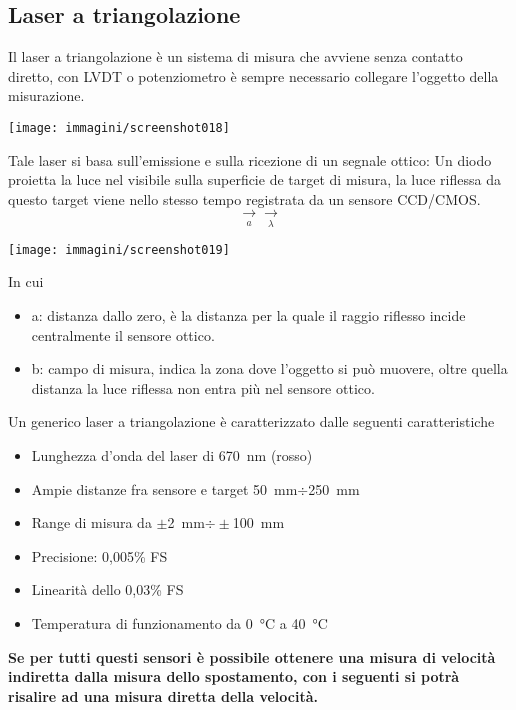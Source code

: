 \documentclass[a4paper, 15pt]{article}
\begin{document}
\subsection{Laser a triangolazione}
\begin{adjustwidth}{2in}{}	 
	Il laser a triangolazione è un sistema di misura che avviene senza contatto diretto, con LVDT o potenziometro è sempre necessario collegare l'oggetto della misurazione. 
	\begin{center}
		\texttt{[image: immagini/screenshot018]}
	\end{center}
	Tale laser si basa sull'emissione e sulla ricezione di un segnale ottico: Un diodo proietta la luce nel visibile sulla superficie de target di misura, la luce riflessa da questo target viene nello stesso tempo registrata da un sensore CCD/CMOS. 
	\[\underset{a}{\rightarrow} \boxed{} \underset{\lambda}{\rightarrow}\] 
	\begin{center}
		\texttt{[image: immagini/screenshot019]}
	\end{center}
	In cui 
	\begin{itemize}
		\item a: distanza dallo zero, è la distanza per la quale il raggio riflesso incide centralmente il sensore ottico.
		\item b: campo di misura, indica la zona dove l'oggetto si può muovere, oltre quella distanza la luce riflessa non entra più nel sensore ottico. 
	\end{itemize}
	Un generico laser a triangolazione è caratterizzato dalle seguenti caratteristiche 
	\begin{itemize}
		\item Lunghezza d’onda del laser di \SI{670}{\nano\metre} (rosso)
	\item Ampie distanze fra sensore e target \SI{50}{\milli\metre}$\div$\SI{250}{\milli\metre}
	\item Range di misura da $\pm$\SI{2}{\milli\metre}$\div\pm$\SI{100}{\milli\metre} 
	\item Precisione: 0,005\% FS
	\item Linearità dello 0,03\% FS
	\item Temperatura di funzionamento da \SI{0}{\degreeCelsius} a \SI{40}{\degreeCelsius}
	\end{itemize}
	
	\begin{center}
		\textbf{Se per tutti questi sensori è possibile ottenere una misura di velocità indiretta dalla misura dello spostamento, con i seguenti si potrà risalire ad una misura diretta della velocità.} 
	\end{center}
\end{adjustwidth}
\newpage			
\end{document}
